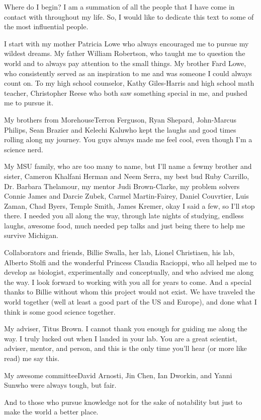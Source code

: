 Where do I begin? I am a summation of all the people that I have come in contact with throughout my life. So, I would like to dedicate this text to some of the most influential people. 

I start with my mother Patricia Lowe who always encouraged me to pursue my wildest dreams. My father William Robertson, who taught me to question the world and to always pay attention to the small things. My brother Fard Lowe, who consistently served as an inspiration to me and was someone I could always count on. To my high school counselor, Kathy Giles-Harris and high school math teacher, Christopher Reese who both saw something special in me, and pushed me to pursue it. 

My brothers from Morehouse\textemdash Terron Ferguson, Ryan Shepard, John-Marcus Philips, Sean Brazier and Kelechi Kalu\textemdash who kept the laughs and good times rolling along my journey. You guys always made me feel cool, even though I'm a science nerd.
  
My MSU family, who are too many to name, but I'll name a few\textemdash my brother and sister, Cameron Khalfani Herman and Neem Serra, my best bud Ruby Carrillo, Dr. Barbara Thelamour, my mentor Judi Brown-Clarke, my problem solvers Connie James and Darcie Zubek, Carmel Martin-Fairey, Daniel Couvrtier, Luis Zaman, Chad Byers, Temple Smith, James Kremer, okay I said a few, so I'll stop there. I needed you all along the way, through late nights of studying, endless laughs, awesome food, much needed pep talks and just being there to help me survive Michigan.

Collaborators and friends, Billie Swalla, her lab, Lionel Christiaen, his lab, Alberto Stolfi and the wonderful Princess Claudia Racioppi, who all helped me to develop as biologist, experimentally and conceptually, and who advised me along the way. I look forward to working with you all for years to come. And a special thanks to Billie without whom this project would not exist. We have traveled the world together (well at least a good part of the US and Europe), and done what I think is some good science together.

My adviser, Titus Brown. I cannot thank you enough for guiding me along the way. I truly lucked out when I landed in your lab. You are a great scientist, adviser, mentor, and person, and this is the only time you'll hear (or more like read) me say this.

My awesome committee\textemdash David Arnosti, Jin Chen, Ian Dworkin, and Yanni Sun\textemdash who were always tough, but fair.

And to those who pursue knowledge not for the sake of notability but just to make the world a better place.
